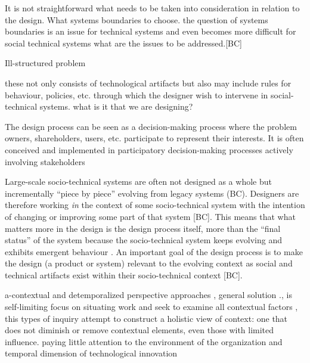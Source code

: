 \begin{svgraybox}
 It is not straightforward what needs to be taken into consideration in relation to the design. What systems boundaries to choose. the question of systems boundaries is an issue for technical systems and even becomes more difficult for social technical systems
what are the issues to be addressed.[BC]

Ill-structured problem

 these not only consists of technological artifacts but also may include rules for behaviour, policies, etc. through which the designer wish to intervene in social-technical systems. what is it that we are designing? 

 The design process can be seen as a decision-making process where the problem owners, shareholders, users, etc. participate to represent their interests. It is often conceived and implemented in participatory decision-making processes actively involving stakeholders

Large-scale socio-technical systems are often not designed as a whole but incrementally ``piece by piece'' evolving from legacy systems (BC). Designers are therefore working \textit{in} the context of some socio-technical system with the intention of changing or improving some part of that system [BC]. This means that what matters more in the design is the design process itself, more than the ``final status'' of the system \cite{Shin2014, need more ref} because the socio-technical system keeps evolving and exhibits emergent behaviour \cite{Nikolic2009}. An important  goal of the design process is to make the design (a product or system) relevant to the evolving context \cite{Shin2014, need more ref} as social and technical artifacts exist within their socio-technical context [BC]. 

\end{svgraybox}



\begin{svgraybox}
a-contextual and detemporalized perspective approaches , general solution ., is self-limiting 
focus on situating work and seek to examine all contextual factors , this types of inquiry attempt to construct a holistic view of context: one that does not diminish or remove contextual elements, even those with limited influence. 
paying little attention to the environment of the organization and temporal dimension of technological innovation 
\end{svgraybox}


